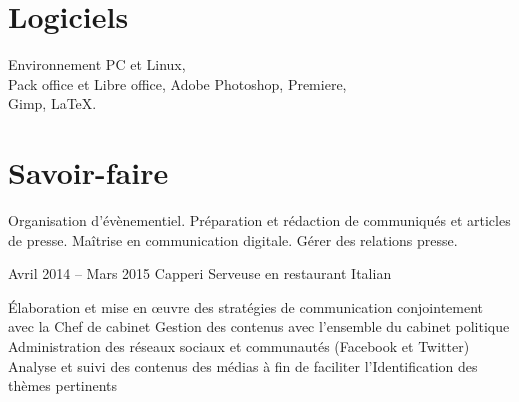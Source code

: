 \documentclass[30pt, french]{tccv}
\begin{document}
\begin{upshape}
\begin{competence}
\vspace{0.5cm}
\section{Logiciels}
Environnement PC et Linux, \\
Pack office et Libre office,
Adobe Photoshop, Premiere, \\
Gimp,
\LaTeX.

\vspace{0.5cm}
\section{Savoir-faire}
\begin{itemize}[leftmargin=13pt]
  \setlength\itemsep{-3pt} 
  \cvitem[\checkmark]  Organisation d'évènementiel.
  \cvitem[\checkmark]  Préparation et rédaction de communiqués et articles de presse.
  \cvitem[\checkmark]  Maîtrise en communication digitale.
  \cvitem[\checkmark]  Gérer des relations presse.
\end{itemize}



\end{competence}




%
%


\begin{experience}



\setlength{\parskip}{0pt}
\item{\color{text} Avril 2014 -- Mars 2015}
     {Capperi}
     {Serveuse en restaurant Italian}
     \fontsize{9pt}{1em}\color{text}\bodyfontlight\upshape\selectfont
%

    \setlength{\parskip}{-10pt}
    \begin{itemize}
      \setlength\itemsep{-3pt} 
      \cvitem[\checkmark] Élaboration et mise en œuvre des stratégies de communication conjointement avec la Chef de cabinet
      \cvitem[\checkmark] Gestion des contenus avec l'ensemble du cabinet politique
      \cvitem[\checkmark] Administration des réseaux sociaux et communautés (Facebook et Twitter)
      \cvitem[\checkmark] Analyse et suivi des contenus des médias à fin de faciliter l'Identification des thèmes pertinents
      

\end{itemize}
\end{experience}
\end{upshape}
\end{document}
